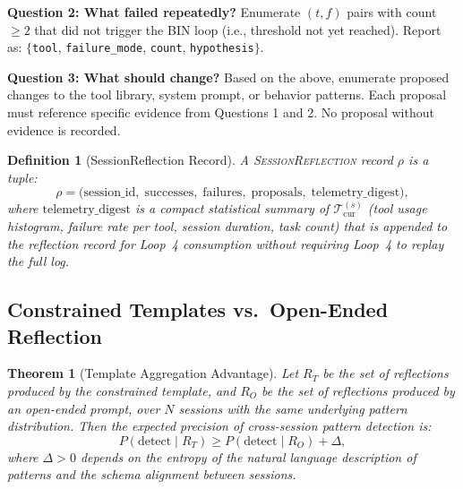 \documentclass[11pt]{article}
\newtheorem{theorem}{Theorem}
\newtheorem{definition}{Definition}
\begin{document}
\noindent\textbf{Question 2: What failed repeatedly?}
Enumerate $(t, f)$ pairs with count $\geq 2$ that did not trigger the BIN
loop (i.e., threshold not yet reached). Report as:
$\{$\texttt{tool}, \texttt{failure\_mode}, \texttt{count}, \texttt{hypothesis}$\}$.

\noindent\textbf{Question 3: What should change?}
Based on the above, enumerate proposed changes to the tool library, system
prompt, or behavior patterns. Each proposal must reference specific evidence
from Questions 1 and 2. No proposal without evidence is recorded.

\vspace{0.5em}

\begin{definition}[SessionReflection Record]
\label{def:session_reflection}
A \textsc{SessionReflection} record $\rho$ is a tuple:
\begin{equation}
\rho = \bigl( \text{session\_id},\; \text{successes},\; \text{failures},\;
              \text{proposals},\; \text{telemetry\_digest} \bigr),
\end{equation}
where $\text{telemetry\_digest}$ is a compact statistical summary of
$\mathcal{T}^{(s)}_{\text{cur}}$ (tool usage histogram, failure rate per tool,
session duration, task count) that is appended to the reflection record for
Loop~4 consumption without requiring Loop~4 to replay the full log.
\end{definition}

\subsection{Constrained Templates vs.\ Open-Ended Reflection}

\begin{theorem}[Template Aggregation Advantage]
\label{thm:template_aggregation}
Let $R_T$ be the set of reflections produced by the constrained template, and
$R_O$ be the set of reflections produced by an open-ended prompt, over $N$
sessions with the same underlying pattern distribution. Then the expected
precision of cross-session pattern detection is:
\begin{equation}
P(\text{detect} \mid R_T) \geq P(\text{detect} \mid R_O) + \Delta,
\end{equation}
where $\Delta > 0$ depends on the entropy of the natural language description
of patterns and the schema alignment between sessions.
\end{theorem}
\end{document}
